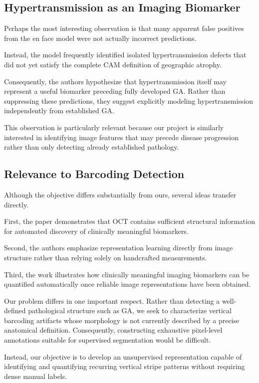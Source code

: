 \documentclass[11pt]{article}
\begin{document}
\subsection{Hypertransmission as an Imaging Biomarker}

Perhaps the most interesting observation is that many apparent false positives from the en face model were not actually incorrect predictions.

Instead, the model frequently identified isolated hypertransmission defects that did not yet satisfy the complete CAM definition of geographic atrophy.

Consequently, the authors hypothesize that hypertransmission itself may represent a useful biomarker preceding fully developed GA. Rather than suppressing these predictions, they suggest explicitly modeling hypertransmission independently from established GA.

This observation is particularly relevant because our project is similarly interested in identifying image features that may precede disease progression rather than only detecting already established pathology.

\subsection{Relevance to Barcoding Detection}

Although the objective differs substantially from ours, several ideas transfer directly.

First, the paper demonstrates that OCT contains sufficient structural information for automated discovery of clinically meaningful biomarkers.

Second, the authors emphasize representation learning directly from image structure rather than relying solely on handcrafted measurements.

Third, the work illustrates how clinically meaningful imaging biomarkers can be quantified automatically once reliable image representations have been obtained.

Our problem differs in one important respect. Rather than detecting a well-defined pathological structure such as GA, we seek to characterize vertical barcoding artifacts whose morphology is not currently described by a precise anatomical definition. Consequently, constructing exhaustive pixel-level annotations suitable for supervised segmentation would be difficult.

Instead, our objective is to develop an unsupervised representation capable of identifying and quantifying recurring vertical stripe patterns without requiring dense manual labels.
\end{document}
